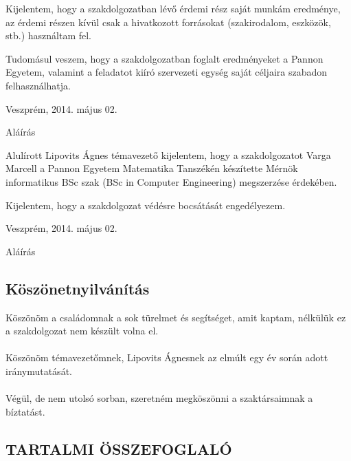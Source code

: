 \documentclass[a4paper,12pt,oneside]{report}
\begin{document}
Kijelentem, hogy a szakdolgozatban lévő érdemi rész saját munkám eredménye, az érdemi részen kívül csak a hivatkozott forrásokat (szakirodalom, eszközök, stb.) használtam fel.

Tudomásul veszem, hogy a szakdolgozatban foglalt eredményeket a Pannon Egyetem, valamint a feladatot kiíró szervezeti egység saját céljaira szabadon felhasználhatja.\\

\begin{flushleft}
{Veszprém, 2014. május 02.\\}
\end{flushleft}

\begin{flushright}
{Aláírás \vspace{4cm}}
\end{flushright}

Alulírott Lipovits Ágnes témavezető kijelentem, hogy a szakdolgozatot Varga Marcell a Pannon Egyetem Matematika Tanszékén készítette Mérnök informatikus BSc szak (BSc in Computer Engineering) megszerzése érdekében.

Kijelentem, hogy a szakdolgozat védésre bocsátását engedélyezem.\\

\begin{flushleft}
{Veszprém, 2014. május 02.\\}
\end{flushleft}

\begin{flushright}
{Aláírás}
\end{flushright}
\newpage
\pagebreak
\begin{center}
\section*{Köszönetnyilvánítás}
\end{center}

Köszönöm a családomnak a sok türelmet és segítséget, amit kaptam, nélkülük ez a szakdolgozat nem készült volna el.
\\
\\
Köszönöm témavezetőmnek, Lipovits Ágnesnek az elmúlt egy év során adott iránymutatását.
\\
\\
Végül, de nem utolsó sorban, szeretném megköszönni a szaktársaimnak a bíztatást.

\newpage

\begin{center}
\section*{\textbf{\Large \MakeUppercase{Tartalmi összefoglaló}}}
\end{center}
\end{document}
